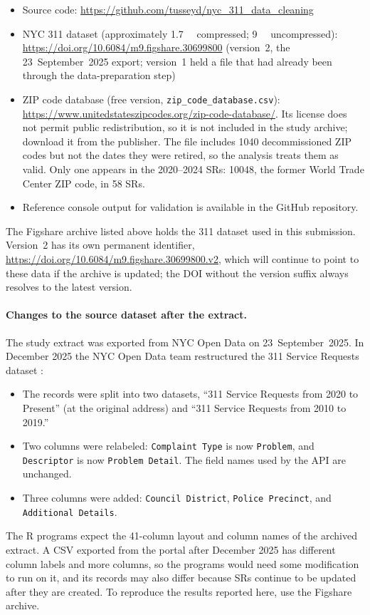 \documentclass[linenumber]{jdsart}
\begin{document}
\begin{itemize}
  \item Source code: \url{https://github.com/tusseyd/nyc_311_data_cleaning}
  \item NYC 311 dataset \citep{nyc311_data} (approximately \SI{1.7}{\giga\byte} compressed; \SI{9}{\giga\byte} uncompressed):\\
  \url{https://doi.org/10.6084/m9.figshare.30699800} (version~2, the
  23~September~2025 export; version~1 held a file that had already been
  through the data-preparation step)
  \item ZIP code database \citep{zipcode_db} (free version, \texttt{zip\_code\_database.csv}):
  \url{https://www.unitedstateszipcodes.org/zip-code-database/}.
  Its license does not permit public redistribution, so it is not included
  in the study archive; download it from the publisher.
  The file includes \num{1040} decommissioned ZIP codes but not the dates
  they were retired, so the analysis treats them as valid. Only one appears
  in the 2020--2024 SRs: 10048, the former World Trade Center ZIP code,
  in \num{58} SRs.
  \item Reference console output for validation is available in the GitHub repository.
\end{itemize}


The Figshare archive listed above holds the 311 dataset used in this
submission. Version~2 has its own permanent identifier,
\url{https://doi.org/10.6084/m9.figshare.30699800.v2}, which will continue
to point to these data if the archive is updated; the DOI without the version
suffix always resolves to the latest version.

\paragraph{Changes to the source dataset after the extract.}
The study extract was exported from NYC Open Data on 23~September~2025.
In December 2025 the NYC Open Data team restructured the 311 Service
Requests dataset \citep{nyc311_updates}:
\begin{itemize}
  \item The records were split into two datasets, ``311 Service Requests
  from 2020 to Present'' (at the original address) and ``311 Service
  Requests from 2010 to 2019.''
  \item Two columns were relabeled: \texttt{Complaint Type} is now
  \texttt{Problem}, and \texttt{Descriptor} is now \texttt{Problem Detail}.
  The field names used by the API are unchanged.
  \item Three columns were added: \texttt{Council District},
  \texttt{Police Precinct}, and \texttt{Additional Details}.
\end{itemize}
The R programs expect the 41-column layout and column names of the
archived extract. A CSV exported from the portal after December 2025
has different column labels and more columns, so the programs would need
some modification to run on it, and its records may also differ because
SRs continue to be updated after they are created. To reproduce the
results reported here, use the Figshare archive.
\end{document}
